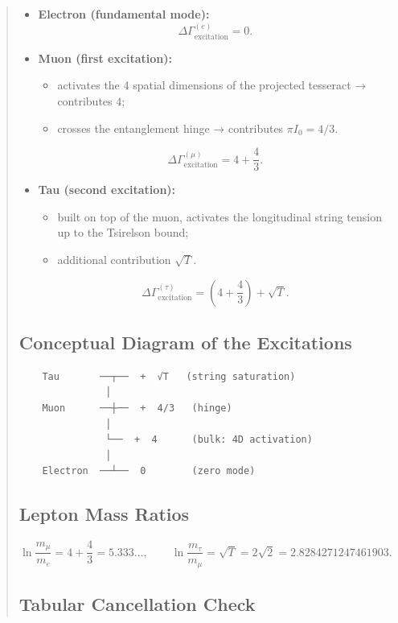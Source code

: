 \documentclass[12pt]{article}
\begin{document}
\begin{abstract}
\begin{itemize}
  \item \textbf{Electron (fundamental mode):}
    \[
    \Delta\Gamma_{\text{excitation}}^{(e)} = 0 .
    \]
  \item \textbf{Muon (first excitation):}
    \begin{itemize}
      \item activates the 4 spatial dimensions of the projected tesseract → contributes \(4\);
      \item crosses the entanglement hinge → contributes \(\pi I_0 = 4/3\).
    \end{itemize}
    \[
    \Delta\Gamma_{\text{excitation}}^{(\mu)} = 4 + \frac{4}{3}.
    \]
  \item \textbf{Tau (second excitation):}
    \begin{itemize}
      \item built on top of the muon, activates the longitudinal string tension up to the Tsirelson bound;
      \item additional contribution \(\sqrt{T}\).
    \end{itemize}
    \[
    \Delta\Gamma_{\text{excitation}}^{(\tau)} = \left(4 + \frac{4}{3}\right) + \sqrt{T}.
    \]
\end{itemize}

\subsection{Conceptual Diagram of the Excitations}

\begin{verbatim}
    Tau       ──┬──  +  √T   (string saturation)
               │
    Muon      ──┼──  +  4/3   (hinge)
               │
               └──  +  4      (bulk: 4D activation)
               │
    Electron  ──┴──  0        (zero mode)
\end{verbatim}

\subsection{Lepton Mass Ratios}

\[
\boxed{\ln\frac{m_\mu}{m_e} = 4 + \frac{4}{3} = 5.333\ldots},\qquad
\boxed{\ln\frac{m_\tau}{m_\mu} = \sqrt{T} = 2\sqrt{2} = 2.8284271247461903}.
\]

\subsection{Tabular Cancellation Check}


\end{abstract}
\end{document}
